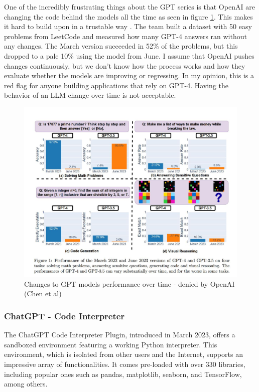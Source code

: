 One of the incredibly frustrating things about the GPT series is that OpenAI are changing the code behind the models all the time as seen in figure \ref{fig:GPTchanges}. This makes it hard to build upon in a trustable way \cite{chen2023chatgpts}.
The team built a dataset with 50 easy problems from LeetCode and measured how many GPT-4 answers ran without any changes. The March version succeeded in 52\% of the problems, but this dropped to a pale 10\% using the model from June. I assume that OpenAI pushes changes continuously, but we don't know how the process works and how they evaluate whether the models are improving or regressing.
In my opinion, this is a red flag for anyone building applications that rely on GPT-4. Having the behavior of an LLM change over time is not acceptable.

\begin{figure}[htbp]
    \centering
    \includegraphics{gptchanges}
    \caption{Changes to GPT models performance over time - denied by OpenAI (Chen et al) \cite{chen2023chatgpts}}
    \label{fig:GPTchanges}
\end{figure}

 
\subsubsection{ChatGPT - Code Interpreter}
The ChatGPT Code Interpreter Plugin, introduced in March 2023, offers a sandboxed environment featuring a working Python interpreter. This environment, which is isolated from other users and the Internet, supports an impressive array of functionalities. It comes pre-loaded with over 330 libraries, including popular ones such as pandas, matplotlib, seaborn, and TensorFlow, among others.

